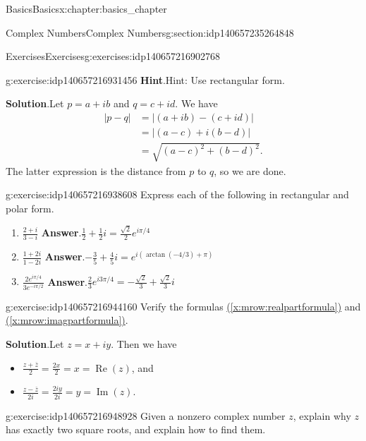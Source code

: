 \documentclass[oneside,10pt,]{book}
\numberwithin{equation}{section}
\DeclareMathOperator{\re}{Re}
\DeclareMathOperator{\im}{Im}
\newcommand{\amp}{&}
\begin{document}
\begin{chapterptx}{Basics}{}{Basics}{}{}{x:chapter:basics_chapter}
\begin{sectionptx}{Complex Numbers}{}{Complex Numbers}{}{}{g:section:idp140657235264848}
\begin{exercises-subsection}{Exercises}{}{Exercises}{}{}{g:exercises:idp140657216902768}
\begin{divisionexercise}{5}{}{}{g:exercise:idp140657216931456}
\noindent\textbf{Hint}.\hypertarget{g:hint:idp140657216934176}{}\quad{}Hint: Use rectangular form.\par\smallskip%
\noindent\textbf{Solution}.\hypertarget{g:solution:idp140657216934608}{}\quad{}Let \(p=a+ib\) and \(q=c+id\). We have%
\begin{align*}
|p-q| \amp = |(a+ib)-(c+id)| \\
\amp = |(a-c)+i(b-d)|\\
\amp = \sqrt{(a-c)^2 + (b-d)^2}.
\end{align*}
The latter expression is the distance from \(p\) to \(q\), so we are done.\end{divisionexercise}%
\begin{divisionexercise}{6}{}{}{g:exercise:idp140657216938608}%
Express each of the following in rectangular and polar form. %
\begin{enumerate}[label=(\alph*)]
\item{}\(\displaystyle \frac{2+i}{3-i}\) \textbf{Answer}.\quad{}\(\displaystyle \frac{1}{2} + \frac{1}{2}i=\frac{\sqrt{2}}{2}e^{i\pi/4}\)%
\item{}\(\displaystyle \frac{1+2i}{1-2i}\) \textbf{Answer}.\quad{}\(\displaystyle -\frac{3}{5} +\frac{4}{5}i=e^{i(\arctan(-4/3)+\pi)}\)%
\item{}\(\displaystyle \frac{2e^{i\pi/4}}{3e^{-i\pi/2}}\) \textbf{Answer}.\quad{}\(\displaystyle \frac{2}{3}e^{i3\pi/4}=-\frac{\sqrt{2}}{3} + \frac{\sqrt{2}}{3}i\)%
\end{enumerate}
\end{divisionexercise}%
\begin{divisionexercise}{7}{}{}{g:exercise:idp140657216944160}%
Verify the formulas \hyperref[x:mrow:realpartformula]{(\ref{x:mrow:realpartformula})} and \hyperref[x:mrow:imagpartformula]{(\ref{x:mrow:imagpartformula})}.\par\smallskip%
\noindent\textbf{Solution}.\hypertarget{g:solution:idp140657216945888}{}\quad{}Let \(z=x+iy\).  Then we have %
\begin{itemize}[label=\textbullet]
\item{}\(\displaystyle \frac{z+\overline{z}}{2}= \frac{2x}{2}=x=\re(z)\), and%
\item{}\(\displaystyle
\frac{z-\overline{z}}{2i}=\frac{2iy}{2i}=y=\im(z)\).%
\end{itemize}
\end{divisionexercise}%
\begin{divisionexercise}{8}{}{}{g:exercise:idp140657216948928}%
Given a nonzero complex number \(z\), explain why \(z\) has exactly two square roots, and explain how to find them.\par\smallskip%

\end{divisionexercise}
\end{exercises-subsection}
\end{sectionptx}
\end{chapterptx}
\end{document}
